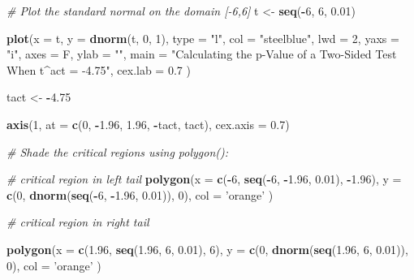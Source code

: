 \documentclass[]{book}
\newenvironment{Shaded}{\begin{snugshade}}{\end{snugshade}}
\newcommand{\KeywordTok}[1]{\textcolor[rgb]{0.13,0.29,0.53}{\textbf{#1}}}
\newcommand{\DataTypeTok}[1]{\textcolor[rgb]{0.13,0.29,0.53}{#1}}
\newcommand{\DecValTok}[1]{\textcolor[rgb]{0.00,0.00,0.81}{#1}}
\newcommand{\FloatTok}[1]{\textcolor[rgb]{0.00,0.00,0.81}{#1}}
\newcommand{\StringTok}[1]{\textcolor[rgb]{0.31,0.60,0.02}{#1}}
\newcommand{\CommentTok}[1]{\textcolor[rgb]{0.56,0.35,0.01}{\textit{#1}}}
\newcommand{\OperatorTok}[1]{\textcolor[rgb]{0.81,0.36,0.00}{\textbf{#1}}}
\newcommand{\NormalTok}[1]{#1}
\theoremstyle{definition}
\theoremstyle{definition}
\theoremstyle{definition}
\theoremstyle{remark}
\begin{document}
\begin{Shaded}
\begin{Highlighting}[]
\CommentTok{# Plot the standard normal on the domain [-6,6]}
\NormalTok{t <-}\StringTok{ }\KeywordTok{seq}\NormalTok{(}\OperatorTok{-}\DecValTok{6}\NormalTok{, }\DecValTok{6}\NormalTok{, }\FloatTok{0.01}\NormalTok{)}

\KeywordTok{plot}\NormalTok{(}\DataTypeTok{x =}\NormalTok{ t, }
     \DataTypeTok{y =} \KeywordTok{dnorm}\NormalTok{(t, }\DecValTok{0}\NormalTok{, }\DecValTok{1}\NormalTok{), }
     \DataTypeTok{type =} \StringTok{"l"}\NormalTok{, }
     \DataTypeTok{col =} \StringTok{"steelblue"}\NormalTok{, }
     \DataTypeTok{lwd =} \DecValTok{2}\NormalTok{, }
     \DataTypeTok{yaxs =} \StringTok{"i"}\NormalTok{, }
     \DataTypeTok{axes =}\NormalTok{ F, }
     \DataTypeTok{ylab =} \StringTok{""}\NormalTok{, }
     \DataTypeTok{main =} \StringTok{"Calculating the p-Value of a Two-Sided Test When t^act = -4.75"}\NormalTok{, }
     \DataTypeTok{cex.lab =} \FloatTok{0.7}
\NormalTok{     )}

\NormalTok{tact <-}\StringTok{ }\OperatorTok{-}\FloatTok{4.75}

\KeywordTok{axis}\NormalTok{(}\DecValTok{1}\NormalTok{, }\DataTypeTok{at =} \KeywordTok{c}\NormalTok{(}\DecValTok{0}\NormalTok{, }\OperatorTok{-}\FloatTok{1.96}\NormalTok{, }\FloatTok{1.96}\NormalTok{, }\OperatorTok{-}\NormalTok{tact, tact), }\DataTypeTok{cex.axis =} \FloatTok{0.7}\NormalTok{)}

\CommentTok{# Shade the critical regions using polygon():}

\CommentTok{# critical region in left tail}
\KeywordTok{polygon}\NormalTok{(}\DataTypeTok{x =} \KeywordTok{c}\NormalTok{(}\OperatorTok{-}\DecValTok{6}\NormalTok{, }\KeywordTok{seq}\NormalTok{(}\OperatorTok{-}\DecValTok{6}\NormalTok{, }\OperatorTok{-}\FloatTok{1.96}\NormalTok{, }\FloatTok{0.01}\NormalTok{), }\OperatorTok{-}\FloatTok{1.96}\NormalTok{),}
        \DataTypeTok{y =} \KeywordTok{c}\NormalTok{(}\DecValTok{0}\NormalTok{, }\KeywordTok{dnorm}\NormalTok{(}\KeywordTok{seq}\NormalTok{(}\OperatorTok{-}\DecValTok{6}\NormalTok{, }\OperatorTok{-}\FloatTok{1.96}\NormalTok{, }\FloatTok{0.01}\NormalTok{)), }\DecValTok{0}\NormalTok{), }
        \DataTypeTok{col =} \StringTok{'orange'}
\NormalTok{        )}

\CommentTok{# critical region in right tail}

\KeywordTok{polygon}\NormalTok{(}\DataTypeTok{x =} \KeywordTok{c}\NormalTok{(}\FloatTok{1.96}\NormalTok{, }\KeywordTok{seq}\NormalTok{(}\FloatTok{1.96}\NormalTok{, }\DecValTok{6}\NormalTok{, }\FloatTok{0.01}\NormalTok{), }\DecValTok{6}\NormalTok{),}
        \DataTypeTok{y =} \KeywordTok{c}\NormalTok{(}\DecValTok{0}\NormalTok{, }\KeywordTok{dnorm}\NormalTok{(}\KeywordTok{seq}\NormalTok{(}\FloatTok{1.96}\NormalTok{, }\DecValTok{6}\NormalTok{, }\FloatTok{0.01}\NormalTok{)), }\DecValTok{0}\NormalTok{), }
        \DataTypeTok{col =} \StringTok{'orange'}
\NormalTok{        )}


\end{Highlighting}
\end{Shaded}
\end{document}
